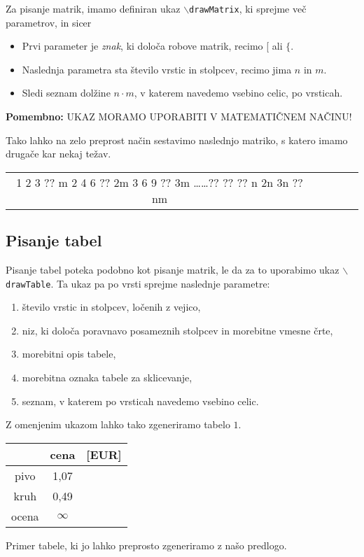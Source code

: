 \documentclass[a4paper, 11pt]{article}
\newcommand{\R}[1]{\texttt{#1}}
\begin{document}
Za pisanje matrik, imamo definiran ukaz $\backslash$\R{drawMatrix},
ki sprejme več parametrov, in sicer
\begin{itemize}
   \item  Prvi parameter je \emph{znak}, ki določa robove matrik, recimo [ ali $\{$.
   \item  Naslednja parametra sta število vrstic in stolpcev, recimo jima $n$ in $m$.
   \item  Sledi seznam dolžine $n\cdot m$, v katerem navedemo vsebino celic, po vrsticah.
\end{itemize}
  
   

\textbf{Pomembno:} {\footnotesize UKAZ MORAMO UPORABITI V MATEMATIČNEM NAČINU!}

Tako lahko na zelo preprost način sestavimo naslednjo matriko, s katero imamo drugače kar nekaj težav.
     \begin{center}
      
         
      
      \begin{tabular}{c c c c c}

      1 2 3 ?? m 
      2 4 6 ?? 2m 
      3 6 9 ?? 3m 
      \dots \dots ?? ?? ?? 
      n  2n 3n ?? nm 
      \end{tabular}
       


     \end{center}
      

\subsection{Pisanje tabel}

Pisanje tabel poteka podobno kot pisanje matrik, le da za to uporabimo ukaz $\backslash$\R{drawTable}.
Ta ukaz pa po vrsti sprejme naslednje parametre:
\begin{enumerate}
   \item število vrstic in stolpcev, ločenih z vejico,
   \item niz, ki določa poravnavo posameznih stolpcev in morebitne vmesne črte,
   \item morebitni opis tabele,
   \item morebitna oznaka tabele za sklicevanje,
   \item seznam, v katerem po vrsticah navedemo vsebino celic.
\end{enumerate}
   
   
Z omenjenim ukazom lahko tako zgeneriramo tabelo $1$.
\begin{center}
   
   \begin{tabular}{c|c c}
      
      &cena  &[EUR]\\  \hline
      pivo &1,07 \\
      kruh &0,49 \\
      ocena &$\infty$ \\
  
   \end{tabular}
\end{center}
      
   Primer tabele, ki jo lahko preprosto zgeneriramo z našo predlogo.

\end{document}
